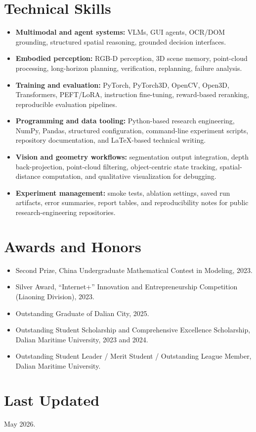 \documentclass[a4paper,9pt]{extarticle}
\begin{document}
\section*{Technical Skills}
\begin{itemize}
  \item \textbf{Multimodal and agent systems:} VLMs, GUI agents, OCR/DOM grounding,
  structured spatial reasoning, grounded decision interfaces.
  \item \textbf{Embodied perception:} RGB-D perception, 3D scene memory, point-cloud
  processing, long-horizon planning, verification, replanning, failure analysis.
  \item \textbf{Training and evaluation:} PyTorch, PyTorch3D, OpenCV, Open3D,
  Transformers, PEFT/LoRA, instruction fine-tuning, reward-based reranking,
  reproducible evaluation pipelines.
  \item \textbf{Programming and data tooling:} Python-based research engineering,
  NumPy, Pandas, structured configuration, command-line experiment scripts,
  repository documentation, and LaTeX-based technical writing.
  \item \textbf{Vision and geometry workflows:} segmentation output integration,
  depth back-projection, point-cloud filtering, object-centric state tracking,
  spatial-distance computation, and qualitative visualization for debugging.
  \item \textbf{Experiment management:} smoke tests, ablation settings, saved run
  artifacts, error summaries, report tables, and reproducibility notes for public
  research-engineering repositories.
\end{itemize}

\section*{Awards and Honors}
\begin{itemize}
  \item Second Prize, China Undergraduate Mathematical Contest in Modeling, 2023.
  \item Silver Award, ``Internet+'' Innovation and Entrepreneurship Competition
  (Liaoning Division), 2023.
  \item Outstanding Graduate of Dalian City, 2025.
  \item Outstanding Student Scholarship and Comprehensive Excellence Scholarship,
  Dalian Maritime University, 2023 and 2024.
  \item Outstanding Student Leader / Merit Student / Outstanding League Member,
  Dalian Maritime University.
\end{itemize}

\section*{Last Updated}
May 2026.
\end{document}
